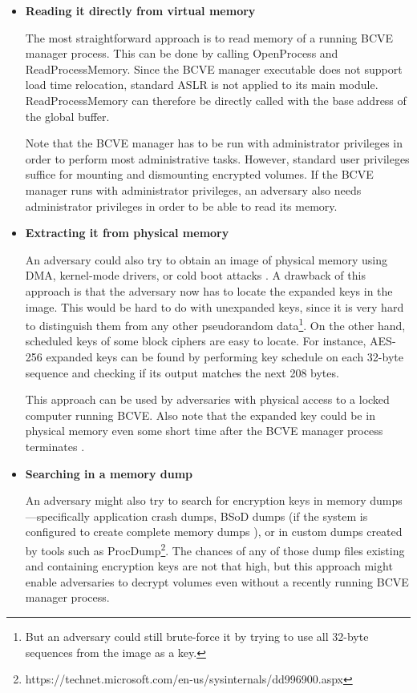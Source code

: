 \documentclass[thesis=B,english]{FITthesis}[2012/10/20]
\begin{document}
	\begin{itemize}
		\item \textbf{Reading it directly from virtual memory}
		
		The most straightforward approach is to read memory of a running BCVE manager process. This can be done by calling OpenProcess and ReadProcessMemory. Since the BCVE manager executable does not support load time relocation, standard ASLR is not applied to its main module. ReadProcessMemory can therefore be directly called with the base address of the global buffer.
		
		Note that the BCVE manager has to be run with administrator privileges in order to perform most administrative tasks. However, standard user privileges suffice for mounting and dismounting encrypted volumes. If the BCVE manager runs with administrator privileges, an adversary also needs administrator privileges in order to be able to read its memory.
		
		\item \textbf{Extracting it from physical memory}
		
		An adversary could also try to obtain an image of physical memory using DMA, kernel-mode drivers, or cold boot attacks \cite{coldboot}. A drawback of this approach is that the adversary now has to locate the expanded keys in the image. This would be hard to do with unexpanded keys, since it is very hard to distinguish them from any other pseudorandom data\footnote{But an adversary could still brute-force it by trying to use all 32-byte sequences from the image as a key.}. On the other hand, scheduled keys of some block ciphers are easy to locate. For instance, AES-256 expanded keys can be found by performing key schedule on each 32-byte sequence and checking if its output matches the next 208 bytes.
		
		This approach can be used by adversaries with physical access to a locked computer running BCVE. Also note that the expanded key could be in physical memory even some short time after the BCVE manager process terminates \cite{russinovich}.
		
		\item \textbf{Searching in a memory dump}	
		
		An adversary might also try to search for encryption keys in memory dumps---specifically application crash dumps, BSoD dumps (if the system is configured to create complete memory dumps \cite{completedump}), or in custom dumps created by tools such as ProcDump\footnote{https://technet.microsoft.com/en-us/sysinternals/dd996900.aspx}. The chances of any of those dump files existing and containing encryption keys are not that high, but this approach might enable adversaries to decrypt volumes even without a recently running BCVE manager process.
		

\end{itemize}
\end{document}

